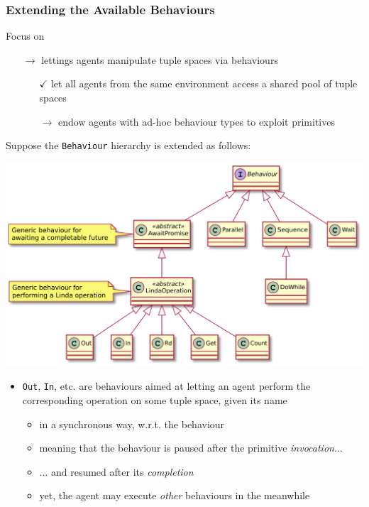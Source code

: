 \documentclass[presentation]{beamer}\mode<presentation>{\usetheme{AMSCesenaPurpleAndGold}}
\begin{document}
\begin{frame}[allowframebreaks]
	\frametitle{Extending the Available Behaviours}

	\begin{alertblock}{Focus on}
		\begin{itemize}
			\item[$\rightarrow$] lettings agents manipulate tuple spaces \alert{via behaviours}
			\begin{itemize}
				\item[$\checkmark$] let all agents from the same environment access a \alert{shared} pool of tuple spaces
				\item[$\rightarrow$] endow agents with ad-hoc behaviour types to exploit \linda{} primitives
			\end{itemize}
		\end{itemize}
	\end{alertblock}

	\framebreak

	Suppose the \texttt{Behaviour} hierarchy is extended as follows:
	\begin{center}
		\includegraphics[width=.8\linewidth]{./img/classes-overview.pdf}
	\end{center}

	\framebreak

	\begin{itemize}
		\item \texttt{Out}, \texttt{In}, etc. are \alert{behaviours} aimed at letting an agent perform the corresponding \linda{} operation on some tuple space, given its name
		\begin{itemize}
			\item in a \alert{synchronous} way, w.r.t. the behaviour
			\item meaning that the behaviour is \alert{paused} after the primitive \emph{invocation}$\ldots$
			\item $\ldots$ and resumed after its \emph{completion}
			\item yet, the agent may execute \emph{other} behaviours in the meanwhile
		\end{itemize}


\end{itemize}
\end{frame}
\end{document}

